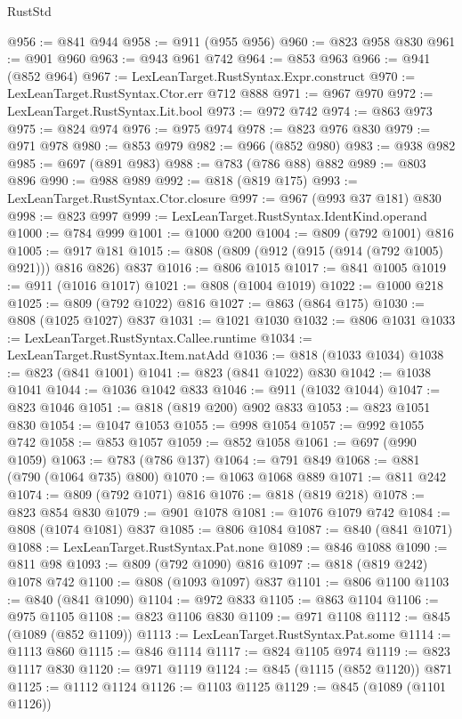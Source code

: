 \begin{lexlean}{RustStd}
\begin{coremodule}
@956 := @841 @944
@958 := @911 (@955 @956)
@960 := @823 @958 @830
@961 := @901 @960
@963 := @943 @961 @742
@964 := @853 @963
@966 := @941 (@852 @964)
@967 := LexLeanTarget.RustSyntax.Expr.construct
@970 := LexLeanTarget.RustSyntax.Ctor.err @712 @888
@971 := @967 @970
@972 := LexLeanTarget.RustSyntax.Lit.bool
@973 := @972 @742
@974 := @863 @973
@975 := @824 @974
@976 := @975 @974
@978 := @823 @976 @830
@979 := @971 @978
@980 := @853 @979
@982 := @966 (@852 @980)
@983 := @938 @982
@985 := @697 (@891 @983)
@988 := @783 (@786 @88) @882
@989 := @803 @896
@990 := @988 @989
@992 := @818 (@819 @175)
@993 := LexLeanTarget.RustSyntax.Ctor.closure
@997 := @967 (@993 @37 @181) @830
@998 := @823 @997
@999 := LexLeanTarget.RustSyntax.IdentKind.operand
@1000 := @784 @999
@1001 := @1000 @200
@1004 := @809 (@792 @1001) @816
@1005 := @917 @181
@1015 := @808 (@809 (@912 (@915 (@914 (@792 @1005) @921))) @816 @826) @837
@1016 := @806 @1015
@1017 := @841 @1005
@1019 := @911 (@1016 @1017)
@1021 := @808 (@1004 @1019)
@1022 := @1000 @218
@1025 := @809 (@792 @1022) @816
@1027 := @863 (@864 @175)
@1030 := @808 (@1025 @1027) @837
@1031 := @1021 @1030
@1032 := @806 @1031
@1033 := LexLeanTarget.RustSyntax.Callee.runtime
@1034 := LexLeanTarget.RustSyntax.Item.natAdd
@1036 := @818 (@1033 @1034)
@1038 := @823 (@841 @1001)
@1041 := @823 (@841 @1022) @830
@1042 := @1038 @1041
@1044 := @1036 @1042 @833
@1046 := @911 (@1032 @1044)
@1047 := @823 @1046
@1051 := @818 (@819 @200) @902 @833
@1053 := @823 @1051 @830
@1054 := @1047 @1053
@1055 := @998 @1054
@1057 := @992 @1055 @742
@1058 := @853 @1057
@1059 := @852 @1058
@1061 := @697 (@990 @1059)
@1063 := @783 (@786 @137)
@1064 := @791 @849
@1068 := @881 (@790 (@1064 @735) @800)
@1070 := @1063 @1068 @889
@1071 := @811 @242
@1074 := @809 (@792 @1071) @816
@1076 := @818 (@819 @218)
@1078 := @823 @854 @830
@1079 := @901 @1078
@1081 := @1076 @1079 @742
@1084 := @808 (@1074 @1081) @837
@1085 := @806 @1084
@1087 := @840 (@841 @1071)
@1088 := LexLeanTarget.RustSyntax.Pat.none
@1089 := @846 @1088
@1090 := @811 @98
@1093 := @809 (@792 @1090) @816
@1097 := @818 (@819 @242) @1078 @742
@1100 := @808 (@1093 @1097) @837
@1101 := @806 @1100
@1103 := @840 (@841 @1090)
@1104 := @972 @833
@1105 := @863 @1104
@1106 := @975 @1105
@1108 := @823 @1106 @830
@1109 := @971 @1108
@1112 := @845 (@1089 (@852 @1109))
@1113 := LexLeanTarget.RustSyntax.Pat.some
@1114 := @1113 @860
@1115 := @846 @1114
@1117 := @824 @1105 @974
@1119 := @823 @1117 @830
@1120 := @971 @1119
@1124 := @845 (@1115 (@852 @1120)) @871
@1125 := @1112 @1124
@1126 := @1103 @1125
@1129 := @845 (@1089 (@1101 @1126))

\end{coremodule}
\end{lexlean}
